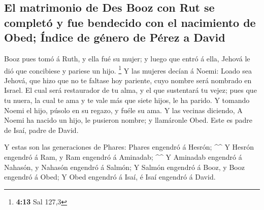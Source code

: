 \hypertarget{el-matrimonio-de-des-booz-con-rut-se-completuxf3-y-fue-bendecido-con-el-nacimiento-de-obed-uxedndice-de-guxe9nero-de-puxe9rez-a-david}{%
\subsection{El matrimonio de Des Booz con Rut se completó y fue
bendecido con el nacimiento de Obed; Índice de género de Pérez a
David}\label{el-matrimonio-de-des-booz-con-rut-se-completuxf3-y-fue-bendecido-con-el-nacimiento-de-obed-uxedndice-de-guxe9nero-de-puxe9rez-a-david}}

 Booz pues tomó á Ruth, y ella fué su mujer; y luego que
entró á ella, Jehová le dió que concibiese y pariese un hijo.
\footnote{\textbf{4:13} Sal 127,3}  Y las mujeres decían á
Noemi: Loado sea Jehová, que hizo que no te faltase hoy pariente, cuyo
nombre será nombrado en Israel.  El cual será restaurador
de tu alma, y el que sustentará tu vejez; pues que tu nuera, la cual te
ama y te vale más que siete hijos, le ha parido.  Y tomando
Noemi el hijo, púsolo en su regazo, y fuéle su ama.  Y las
vecinas diciendo, A Noemi ha nacido un hijo, le pusieron nombre; y
llamáronle Obed. Este es padre de Isaí, padre de David.

 Y estas son las generaciones de Phares: Phares engendró á
Hesrón; \^{}\^{}  Y Hesrón engendró á Ram, y Ram engendró á
Aminadab; \^{}\^{}  Y Aminadab engendró á Nahasón, y
Nahasón engendró á Salmón;  Y Salmón engendró á Booz, y
Booz engendró á Obed;  Y Obed engendró á Isaí, é Isaí
engendró á David.
